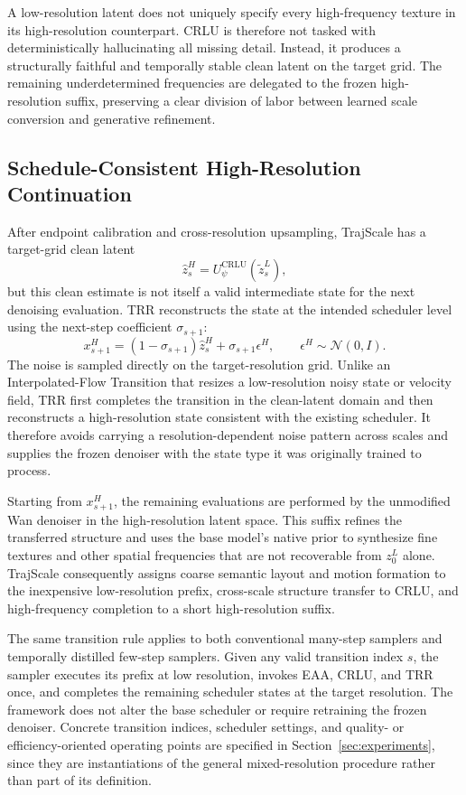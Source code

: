 A low-resolution latent does not uniquely specify every high-frequency
texture in its high-resolution counterpart. CRLU is therefore not tasked
with deterministically hallucinating all missing detail. Instead, it
produces a structurally faithful and temporally stable clean latent on the
target grid. The remaining underdetermined frequencies are delegated to
the frozen high-resolution suffix, preserving a clear division of labor
between learned scale conversion and generative refinement.

\subsection{Schedule-Consistent High-Resolution Continuation}
\label{sec:hr_continuation}

After endpoint calibration and cross-resolution upsampling, TrajScale has
a target-grid clean latent
\[
\widehat z_s^H
=U_\psi^{\mathrm{CRLU}}(\widetilde z_s^L),
\]
but this clean estimate is not itself a valid intermediate state for the
next denoising evaluation. TRR reconstructs the state at the intended
scheduler level using the next-step coefficient \(\sigma_{s+1}\):
\[
x_{s+1}^H
=(1-\sigma_{s+1})\widehat z_s^H
+\sigma_{s+1}\epsilon^H,
\qquad
\epsilon^H\sim\mathcal N(0,I).
\]
The noise is sampled directly on the target-resolution grid. Unlike an
Interpolated-Flow Transition that resizes a low-resolution noisy state or
velocity field, TRR first completes the transition in the clean-latent
domain and then reconstructs a high-resolution state consistent with the
existing scheduler. It therefore avoids carrying a resolution-dependent
noise pattern across scales and supplies the frozen denoiser with the
state type it was originally trained to process.

Starting from \(x_{s+1}^H\), the remaining evaluations are performed by
the unmodified Wan denoiser in the high-resolution latent space. This
suffix refines the transferred structure and uses the base model's native
prior to synthesize fine textures and other spatial frequencies that are
not recoverable from \(z_0^L\) alone. TrajScale consequently assigns
coarse semantic layout and motion formation to the inexpensive
low-resolution prefix, cross-scale structure transfer to CRLU, and
high-frequency completion to a short high-resolution suffix.

The same transition rule applies to both conventional many-step samplers
and temporally distilled few-step samplers. Given any valid transition
index \(s\), the sampler executes its prefix at low resolution, invokes
EAA, CRLU, and TRR once, and completes the remaining scheduler states at
the target resolution. The framework does not alter the base scheduler or
require retraining the frozen denoiser. Concrete transition indices,
scheduler settings, and quality- or efficiency-oriented operating points
are specified in Section~\ref{sec:experiments}, since they are
instantiations of the general mixed-resolution procedure rather than part
of its definition.

